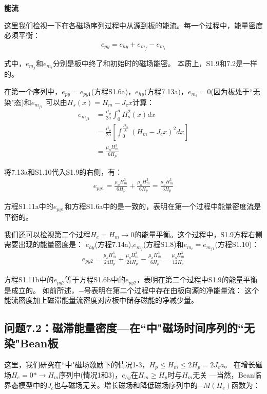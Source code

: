 \textbf{能流}

这里我们检视一下在各磁场序列过程中从源到板的能流。每一个过程中，能量密度必须平衡：
\begin{align*}%
e_{py}=e_{hy}+e_{m_f}-e_{m_i} \tag{S1.9}
\end{align*}

式中，$e_{m_f}$和$e_{m_i}$分别是板中终了和初始时的磁场能密。
本质上，S1.9和7.2是一样的。

在第一个序列中，$e_{py}=e_{py1}$(方程S1.6a)，$e_{hy}$(方程7.13a)，$e_{m_i}=0$(因为板处于``无染"态)和$e_{m_{f1}}$
可以由$H_s(x)=H_m-J_c x$计算：
\begin{align*}%
e_{m_{f1}}&=\frac{\mu_o}{2a}\int_{0}^{a}H_{s}^{2}(x)dx \\
&=\frac{\mu_o}{2a}\left[\int_{0}^{\frac{H_m}{J_c}}(H_m-J_cx)^2dx\right]\\
&=\frac{\mu_oH_{m}^{3}}{6H_p} \tag{S1.10}
\end{align*}

将7.13a和S1.10代入S1.9的右侧，有：
\begin{align*}%
e_{py1}=\frac{\mu_oH_{m}^{3}}{6H_p}+\frac{\mu_oH_{m}^{3}}{6H_p}=\frac{\mu_oH_{m}^{3}}{3H_p} \tag{S1.11a}
\end{align*}

方程S1.11a中的$e_{py1}$和方程S1.6a中的是一致的，表明在第一个过程中能量密度流是平衡的。

我们还可以检视第二个过程$H_e=H_m\rightarrow 0$的能量平衡。这个过程中，S1.9方程右侧需要出现的能量密度是：
$e_{hy}$(方程7.14a),$e_{m_f}$(方程S1.8)和$e_{m_i}=e_{m_{f1}}$(方程S1.10)：
\begin{align*}%
e_{py2}=\frac{\mu_oH_{m}^{3}}{24H_p}+\frac{\mu_oH_{m}^{3}}{24H_p}-\frac{\mu_oH_{m}^{3}}{6H_p}=\frac{\mu_oH_{m}^{3}}{12H_p} \tag{S1.11b}
\end{align*}

方程S1.11b中的$e_{py2}$等于方程S1.6b中的$e_{py2}$，表明在第二个过程中S1.9的能量平衡是成立的。
如前所述，$-$号表明在第二个过程中存在由板向源的净能量流：
这个能流密度加上磁滞能量流密度对应板中储存磁能的净减少量。


\subsection{问题7.2：磁滞能量密度---在``中"磁场时间序列的``无染"Bean板}
这里，我们研究在``中"磁场激励下的情况1-3，$H_p\le H_m\le2H_p=2J_c a$。
在增长磁场$H_e=0*\rightarrow H_m$序列中(情况1和3)，$e_{hy}$在$H_m\ge H_p$时与$H_m$无关
---当然，Bean临界态模型中的$J_c$也与磁场无关。增长磁场和降低磁场序列中的$−M(H_e)$函数为：

